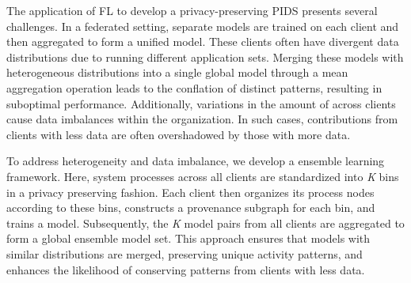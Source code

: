 


The application of FL to develop a privacy-preserving PIDS presents several challenges. In a federated setting, separate models are trained on each client and then aggregated to form a unified model. These clients often have divergent data distributions due to running different application sets. Merging these models with heterogeneous distributions into a single global model through a mean aggregation operation leads to the conflation of distinct patterns, resulting in suboptimal performance. Additionally, variations in the amount of \logs across clients cause data imbalances within the organization. In such cases, contributions from clients with less data are often overshadowed by those with more data.

To address heterogeneity and data imbalance, we develop a \gnnshort ensemble learning framework. Here, system processes across all clients are standardized into \textit{K} bins in a privacy preserving fashion. Each client then organizes its process nodes according to these bins, constructs a provenance subgraph for each bin, and trains a \gnnshort model. Subsequently, the \textit{K} model pairs from all clients are aggregated to form a global ensemble model set. This approach ensures that models with similar distributions are merged, preserving unique activity patterns, and enhances the likelihood of conserving patterns from clients with less data.

